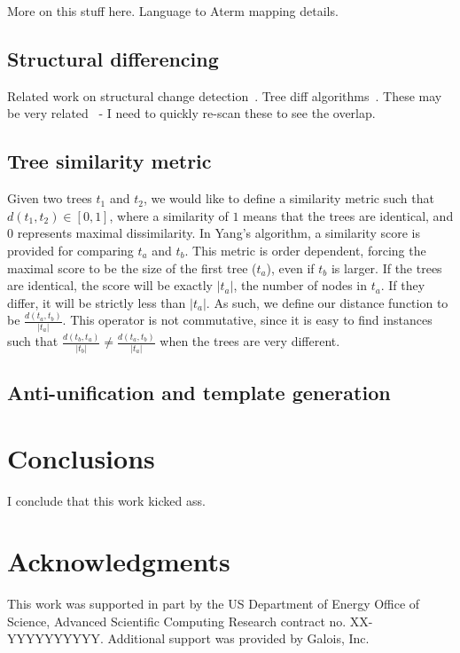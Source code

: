 \documentclass{acm_proc_article-sp}
\begin{document}
More on this stuff here.  Language to Aterm mapping details.

\subsection{Structural differencing}

Related work on structural change detection~\cite{chawathe96change}.  Tree
diff algorithms~\cite{tai79tree, selkow77tree}.  These may be very
related~\cite{weissgerber06identify, kim07automatic, neamtiu05understand} - I
need to quickly re-scan these to see the overlap.

\subsection{Tree similarity metric}

Given two trees $t_1$ and $t_2$, we would like to define a similarity metric
such that $d(t_1, t_2) \in [0,1]$, where a similarity of $1$ means that the
trees are identical, and $0$ represents maximal dissimilarity.  In Yang's
algorithm, a similarity score is provided for comparing $t_a$ and $t_b$. This
metric is order dependent, forcing the maximal score to be the size of the
first tree ($t_a$), even if $t_b$ is larger.  If the trees are identical, the
score will be exactly $|t_a|$, the number of nodes in $t_a$.  If they differ,
it will be strictly less than $|t_a|$.  As such, we define our distance
function to be $\frac{d(t_a, t_b)}{|t_a|}$.  This operator is not commutative,
since it is easy to find instances such that $\frac{d(t_b, t_a)}{|t_b|} \neq
\frac{d(t_a, t_b)}{|t_a|}$ when the trees are very different.

\subsection{Anti-unification and template generation}

\section{Conclusions}

I conclude that this work kicked ass.

\section{Acknowledgments}

This work was supported in part by the US Department of
Energy Office of Science, Advanced Scientific Computing Research
contract no. XX-YYYYYYYYYY.  Additional support was provided by Galois,
Inc.
\end{document}
